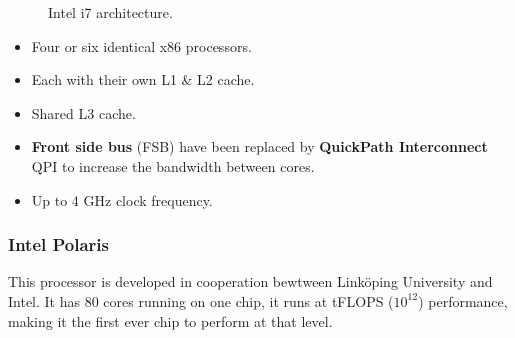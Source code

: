 \begin{figure}[H]
  \centering
  \caption{Intel i7 architecture.}
  \label{fig:intel-i7}
\end{figure}
\newpage

\begin{itemize}
\item Four or six identical x86 processors. 
\item Each with their own L1 \& L2 cache.
\item Shared L3 cache.
\item \textbf{Front side bus} (FSB) have been replaced by \textbf{QuickPath Interconnect} QPI to increase the bandwidth between cores.
\item Up to 4 GHz clock frequency.
\end{itemize}

\subsubsection{Intel Polaris}
This processor is developed in cooperation bewtween Linköping University and Intel. It has 80 cores running on one chip, it runs at tFLOPS ($10^{12}$) performance, making it the first ever chip to perform at that level.

